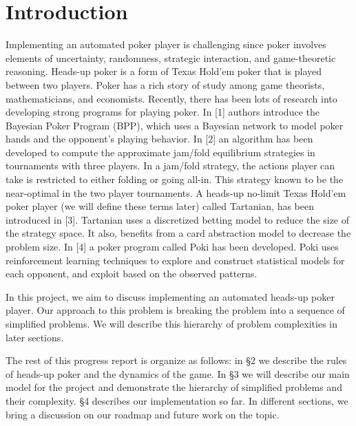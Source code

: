\section{Introduction}\label{intro}
Implementing an automated poker player is challenging since poker involves
elements of uncertainty, randomness, strategic interaction, and game-theoretic
reasoning. Heads-up poker is a form of Texas Hold'em poker that is played 
between two players. Poker 
has a rich story of study among game theorists, mathematicians, 
and economists. Recently, there has been lots  of research into 
developing strong programs for playing poker. In [1] authors introduce
the Bayesian Poker Program (BPP), which uses a Bayesian network to model 
poker hands and the opponent's playing behavior. In [2] an algorithm has been developed
to compute the approximate jam/fold equilibrium strategies in tournaments 
with three players. In a jam/fold strategy, the actions player can take is restricted to 
either folding or going all-in. This strategy known to be 
the near-optimal in the two player tournaments. A heads-up no-limit Texas 
Hold'em poker player (we will define these terms later) called Tartanian, 
has been introduced in [3]. Tartanian
uses a discretized betting model to reduce the size of the strategy space.
It also, benefits from a card abstraction model to decrease the problem size.
In [4] a poker program called Poki has been developed. Poki uses reinforcement 
learning techniques to explore and construct statistical models for each opponent,
and exploit based on the observed patterns. 

In this project, we aim to discuss implementing an 
automated heads-up poker player. Our approach to this problem is breaking
the problem into a sequence of simplified problems. We will describe this hierarchy
of problem complexities in later sections.

The rest of this progress report is organize as follows: in \S 2 we describe the
rules of heads-up poker and the dynamics of the game. In \S 3 we will
describe our main model for the project and 
demonstrate the hierarchy of simplified problems and their complexity.
\S 4 describes our implementation
so far. In different sections, we bring a discussion on our roadmap and future work on the topic.
